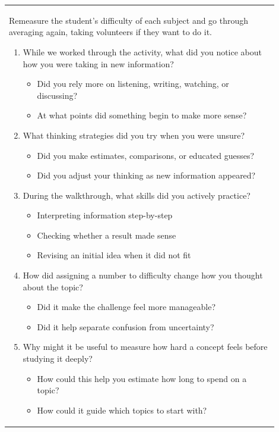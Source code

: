 \documentclass{article}
\begin{document}
\begin{tabular}{|p{0.9\linewidth}|}
\hline
Remeasure the student's difficulty of each subject and go through averaging again, taking volunteers if they want to do it.
\begin{enumerate}
    \item While we worked through the activity, what did you notice about how you were taking in new information?
    \begin{itemize}
        \item Did you rely more on listening, writing, watching, or discussing?
        \item At what points did something begin to make more sense?
    \end{itemize}

    \item What thinking strategies did you try when you were unsure?
    \begin{itemize}
        \item Did you make estimates, comparisons, or educated guesses?
        \item Did you adjust your thinking as new information appeared?
    \end{itemize}

    \item During the walkthrough, what skills did you actively practice?
    \begin{itemize}
        \item Interpreting information step-by-step
        \item Checking whether a result made sense
        \item Revising an initial idea when it did not fit
    \end{itemize}

    \item How did assigning a number to difficulty change how you thought about the topic?
    \begin{itemize}
        \item Did it make the challenge feel more manageable?
        \item Did it help separate confusion from uncertainty?
    \end{itemize}

    \item Why might it be useful to measure how hard a concept feels before studying it deeply?
    \begin{itemize}
        \item How could this help you estimate how long to spend on a topic?
        \item How could it guide which topics to start with?
    \end{itemize}


\end{enumerate}
\end{tabular}
\end{document}
